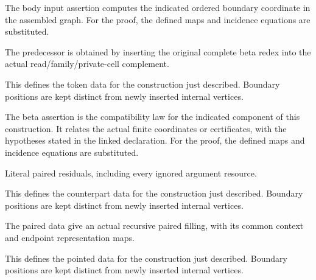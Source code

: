 The body input assertion computes the indicated ordered boundary coordinate in the assembled graph.
For the proof, the defined maps and incidence equations are substituted.
\par{}

The predecessor is obtained by inserting the original complete beta redex into the actual read/family/private-cell complement.
\par{}

This defines the token data for the construction just described. Boundary positions are kept distinct from newly inserted internal vertices.
\par{}

The beta assertion is the compatibility law for the indicated component of this construction. It relates the actual finite coordinates or certificates, with the hypotheses stated in the linked declaration.
For the proof, the defined maps and incidence equations are substituted.
\par{}

Literal paired residuals, including every ignored argument resource.
\par{}

This defines the counterpart data for the construction just described. Boundary positions are kept distinct from newly inserted internal vertices.
\par{}

The paired data give an actual recursive paired filling, with its common context and endpoint representation maps.
\par{}

This defines the pointed data for the construction just described. Boundary positions are kept distinct from newly inserted internal vertices.
\par{}

